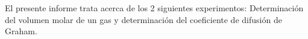 \documentclass[../main.tex]{subfiles}
\begin{document}
El presente informe trata acerca de los 2 siguientes experimentos: Determinación 
del volumen molar de un gas y determinación del coeficiente de difusión de Graham. 
\end{document}
